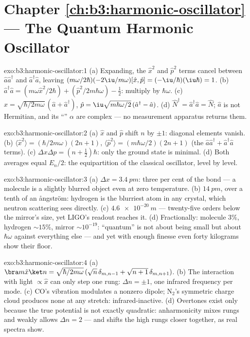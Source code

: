 \section*{Chapter \ref{ch:b3:harmonic-oscillator} --- The Quantum Harmonic Oscillator}

\begin{solution}{exo:b3:harmonic-oscillator:1}
(a) Expanding, the $\hat x^2$ and $\hat p^2$ terms cancel between
$\hat a\hat a^\dagger$ and $\hat a^\dagger\hat a$, leaving
$(m\omega/2\hbar)(-2\iu/m\omega)[\hat x, \hat p] =
(-\iu/\hbar)(\iu\hbar) = 1$. (b) $\hat a^\dagger\hat a = (m\omega\hat x^2/2\hbar) +
(\hat p^2/2m\hbar\omega) - \tfrac12$: multiply by $\hbar\omega$. (c)
$\hat x = \sqrt{\hbar/2m\omega}\,(\hat a + \hat a^\dagger)$, $\hat p
= \iu\sqrt{m\hbar\omega/2}\,(\hat a^\dagger - \hat a)$. (d) $\hat
N^\dagger = \hat a^\dagger\hat a = \hat N$; $\hat a$ is not
Hermitian, and its ``'' $\alpha$ are complex --- no
measurement apparatus returns them.
\end{solution}

\begin{solution}{exo:b3:harmonic-oscillator:2}
(a) $\hat x$ and $\hat p$ shift $n$ by $\pm1$: diagonal elements
vanish. (b) $\langle\hat x^2\rangle = (\hbar/2m\omega)(2n + 1)$,
$\langle\hat p^2\rangle = (m\hbar\omega/2)(2n + 1)$ (the $\hat
a\hat a^\dagger + \hat a^\dagger\hat a$ terms). (c) $\Delta x\Delta p
= (n + \tfrac12)\hbar$: only the ground state is minimal. (d) Both
averages equal $E_n/2$: the equipartition of the classical
oscillator, level by level.
\end{solution}

\begin{solution}{exo:b3:harmonic-oscillator:3}
(a) $\Delta x = \qty{3.4}{pm}$: three per cent of the bond --- a
molecule is a slightly blurred object even at zero temperature. (b)
$\qty{14}{pm}$, over a tenth of an \aa ngstr\"om: hydrogen is the
blurriest atom in any crystal, which neutron scattering sees
directly. (c) $\qty{4.6e-20}{m}$ --- twenty-five orders below the
mirror's size, yet LIGO's readout reaches it. (d) Fractionally:
molecule $3\%$, hydrogen $\sim15\%$, mirror $\sim10^{-19}$:
``quantum'' is not about being small but about $\hbar\omega$
against everything else --- and yet with enough finesse even forty
kilograms show their floor.
\end{solution}

\begin{solution}{exo:b3:harmonic-oscillator:4}
(a) $\bra m\hat x\ket n = \sqrt{\hbar/2m\omega}\,(\sqrt n\,
\delta_{m,n-1} + \sqrt{n + 1}\,\delta_{m,n+1})$. (b) The interaction
with light $\propto\hat x$ can only step one rung: $\Delta n =
\pm1$, one infrared frequency per mode. (c) CO's vibration modulates
a nonzero dipole; N$_2$'s symmetric charge cloud produces none at
any stretch: infrared-inactive. (d) Overtones exist only because the
true potential is not exactly quadratic: anharmonicity mixes rungs
and weakly allows $\Delta n = 2$ --- and shifts the high rungs
closer together, as real spectra show.
\end{solution}

